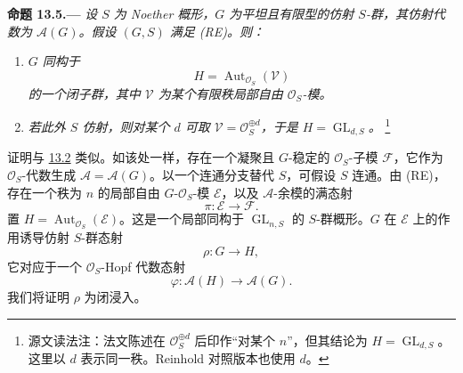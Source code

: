 \medskip
{}\label{prop:sga3-VIB-13.5}%
\noindent\textbf{命题 13.5.---}
\emph{设 \(S\) 为 Noether 概形，\(G\) 为平坦且有限型的仿射 \(S\)-群，其仿射代数为 \(\mathcal A(G)\)。假设 \((G,S)\) 满足 \textup{(RE)}。则：}
\begin{enumerate}
\item[\textup{(i)}]\label{concl:sga3-VIB-13.5-i}
  \emph{\(G\) 同构于}
\[
    H=\operatorname{Aut}_{\mathcal O_S}(\mathcal V)
  \]
  \emph{的一个闭子群，其中 \(\mathcal V\) 为某个有限秩局部自由 \(\mathcal O_S\)-模。}

\item[\textup{(ii)}]\label{concl:sga3-VIB-13.5-ii}
  \emph{若此外 \(S\) 仿射，则对某个 \(d\) 可取 \(\mathcal V=\mathcal O_S^{\oplus d}\)，于是 \(H=\operatorname{GL}_{d,S}\)。}%
  \begingroup
  \renewcommand{\thefootnote}{\fnsymbol{footnote}}%
  \footnote[2]{\label{note:sga3-VIB-13.5-ii-rank-letter}
  源文读法注：法文陈述在 \(\mathcal O_S^{\oplus d}\) 后印作“对某个 \(n\)”，但其结论为 \(H=\operatorname{GL}_{d,S}\)。这里以 \(d\) 表示同一秩。Reinhold 对照版本也使用 \(d\)。}%
  \endgroup
\end{enumerate}

证明与 \hyperref[prop:sga3-VIB-13.2]{13.2} 类似。如该处一样，存在一个凝聚且 \(G\)-稳定的 \(\mathcal O_S\)-子模 \(\mathcal F\)，它作为 \(\mathcal O_S\)-代数生成 \(\mathcal A=\mathcal A(G)\)。以一个连通分支替代 \(S\)，可假设 \(S\) 连通。由 \textup{(RE)}，存在一个秩为 \(n\) 的局部自由 \(G\)-\(\mathcal O_S\)-模 \(\mathcal E\)，以及 \(\mathcal A\)-余模的满态射
\[
  \pi:\mathcal E\longrightarrow\mathcal F.
\]
置 \(H=\operatorname{Aut}_{\mathcal O_S}(\mathcal E)\)。这是一个局部同构于 \(\operatorname{GL}_{n,S}\) 的 \(S\)-群概形。\(G\) 在 \(\mathcal E\) 上的作用诱导仿射 \(S\)-群态射
\[
  \rho:G\longrightarrow H,
\]
它对应于一个 \(\mathcal O_S\)-Hopf 代数态射
\[
  \varphi:\mathcal A(H)\longrightarrow\mathcal A(G).
\]
我们将证明 \(\rho\) 为闭浸入。

